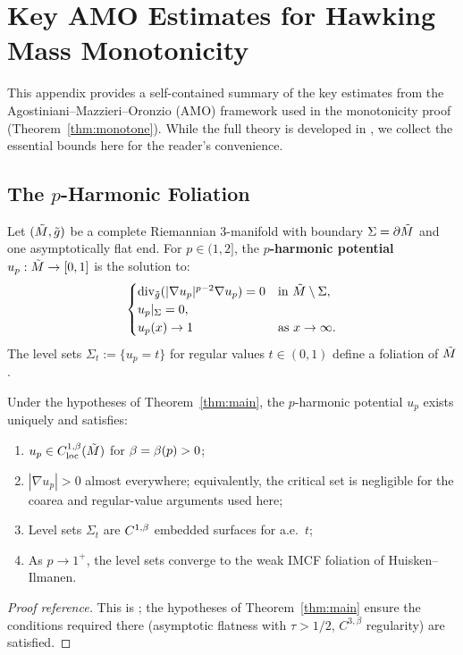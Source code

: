 \section{Key AMO Estimates for Hawking Mass Monotonicity}\label{app:amo-estimates}

This appendix provides a self-contained summary of the key estimates from the Agostiniani--Mazzieri--Oronzio (AMO) framework \cite{amo2022} used in the monotonicity proof (Theorem~\ref{thm:monotone}). While the full theory is developed in \cite{amo2022}, we collect the essential bounds here for the reader's convenience.

\subsection{The \texorpdfstring{$p$}{p}-Harmonic Foliation}

\begin{definition}\label{def:p-harmonic-app}
Let $(\tilde{M}, \tilde{g})$ be a complete Riemannian 3-manifold with boundary $\Sigma = \partial\tilde{M}$ and one asymptotically flat end. For $p \in (1, 2]$, the \textbf{$p$-harmonic potential} $u_p: \tilde{M} \to [0,1]$ is the solution to:
\begin{equation}\label{eq:p-harmonic-app}
\begin{cases}
\mathrm{div}_{\tilde{g}}(|\nabla u_p|^{p-2}\nabla u_p) = 0 & \text{in } \tilde{M} \setminus \Sigma, \\
u_p|_\Sigma = 0, \\
u_p(x) \to 1 & \text{as } x \to \infty.
\end{cases}
\end{equation}
The level sets $\Sigma_t := \{u_p = t\}$ for regular values $t \in (0,1)$ define a foliation of $\tilde{M}$.
\end{definition}

\begin{proposition}\label{prop:p-harmonic-exist-app}
Under the hypotheses of Theorem~\ref{thm:main}, the $p$-harmonic potential $u_p$ exists uniquely and satisfies:
\begin{enumerate}[label=\textup{(\roman*)}]
    \item $u_p \in C^{1,\beta}_{\mathrm{loc}}(\tilde{M})$ for $\beta = \beta(p) > 0$;
    \item $|\nabla u_p| > 0$ almost everywhere; equivalently, the critical set is negligible for the coarea and regular-value arguments used here;
    \item Level sets $\Sigma_t$ are $C^{1,\beta}$ embedded surfaces for a.e.\ $t$;
    \item As $p \to 1^+$, the level sets converge to the weak IMCF foliation of Huisken--Ilmanen.
\end{enumerate}
\end{proposition}
\begin{proof}[Proof reference]
This is \cite[Theorem~2.3]{amo2022}; the hypotheses of Theorem~\ref{thm:main} ensure the conditions required there (asymptotic flatness with $\tau>1/2$, $C^{3,\beta}$ regularity) are satisfied.
\end{proof}

